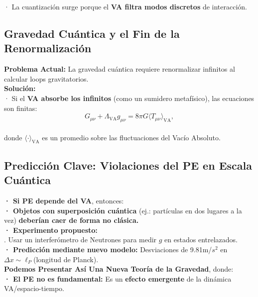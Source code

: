 \documentclass[a4paper]{article}
\theoremstyle{definition}
\theoremstyle{remark}
\numberwithin{equation}{section}
\begin{document}
	· La cuantización surge porque el \textbf{VA filtra modos discretos} de interacción.
	
	\subsection{Gravedad Cuántica y el Fin de la Renormalización}
	
	\textbf{Problema Actual:} La gravedad cuántica requiere renormalizar infinitos al calcular loops gravitatorios.\\
	
	\textbf{Solución:}\\
	
	· Si el \textbf{VA absorbe los infinitos} (como un sumidero metafísico), las ecuaciones son finitas:\\
	
	\[
	G_{\mu\nu} + \Lambda_{\text{VA}} g_{\mu\nu} = 8\pi G \langle T_{\mu\nu} \rangle_{\text{VA}},
	\]\\
	
	donde \(\langle \cdot \rangle_{\text{VA}}\) es un promedio sobre las fluctuaciones del Vacío Absoluto.
	
	
	\subsection{Predicción Clave: Violaciones del PE en Escala Cuántica}
	
	
	\textbf{· Si PE depende del VA}, entonces:\\
	
	\textbf{· Objetos con superposición cuántica} (ej.: partículas en dos lugares a la vez) \textbf{deberían caer de forma no clásica.}\\
	
	\textbf{· Experimento propuesto:}\\
	
	. Usar un interferómetro de Neutrones para medir \(g\) en estados entrelazados.\\
	
	\textbf{· Predicción mediante nuevo modelo:} Desviaciones de 9.81m/\(s^2\) en \(\Delta x \sim \ell_P\)(longitud de Planck).\\
	
	
	\textbf{Podemos Presentar Así Una Nueva Teoría de la Gravedad}, donde:\\
	
	\textbf{· El PE no es fundamental:} Es un \textbf{efecto emergente} de la dinámica VA/espacio-tiempo.\\
	
\end{document}
